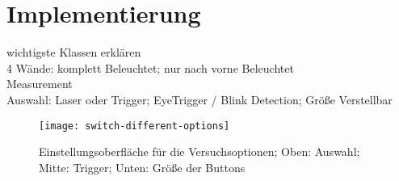 \section{Implementierung}
wichtigste Klassen erklären \\

4 Wände: komplett Beleuchtet; nur nach vorne Beleuchtet \\

Measurement \\
Auswahl: Laser oder Trigger; EyeTrigger / Blink Detection; Größe Verstellbar \\

\begin{figure}[!htbp]
	\centering
	\texttt{[image: switch-different-options]}
	\caption[Einstellungsoberfläche für die Versuchsoptionen]{Einstellungsoberfläche für die Versuchsoptionen; Oben: Auswahl; Mitte: Trigger; Unten: Größe der Buttons}
	\label{fig:switch-different-options}
\end{figure}